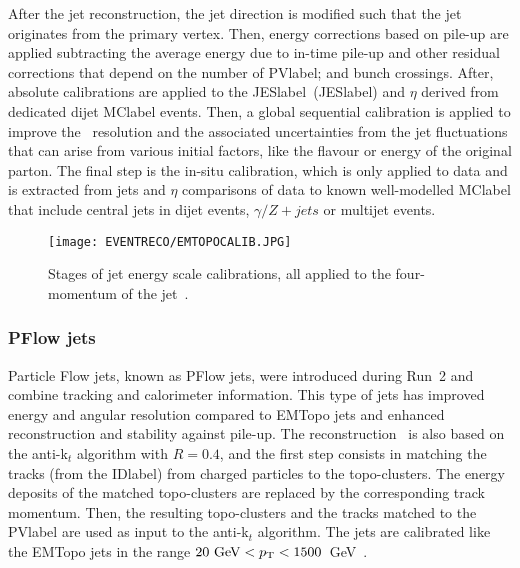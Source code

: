 After the jet reconstruction, the jet direction is modified such that the jet originates from the primary vertex. Then, energy corrections based on pile-up are applied subtracting the average energy due to in-time pile-up and other residual corrections that depend on the number of \acrshort{PVlabel}; and bunch crossings. After, absolute calibrations are applied to the \acrlong{JESlabel}~(\acrshort{JESlabel}) and $\eta$ derived from dedicated dijet \acrshort{MClabel} events. Then, a global sequential calibration is applied to improve the \pT\ resolution and the associated uncertainties from the jet fluctuations that can arise from various initial factors, like the flavour or energy of the original parton. The final step is the in-situ calibration, which is only applied to data and is extracted from jets \pT and $\eta$ comparisons of data to known well-modelled \acrshort{MClabel} that include central jets in dijet events, $\gamma/Z+jets$ or multijet events. 

\clearpage
\begin{figure}[htbp]
    \RawFloats
    \begin{center}
    \texttt{[image: EVENTRECO/EMTOPOCALIB.JPG]}
    \caption{
        Stages of jet energy scale calibrations, all applied to the four-momentum of the jet~\cite{2007.02645}. 
    }
    \label{figEVNTRECO:EMTOPO}
    \end{center}
\end{figure}
\subsubsection{PFlow jets}

Particle Flow jets, known as PFlow jets, were introduced during Run~2 and combine tracking and calorimeter information. This type of jets has improved energy and angular resolution compared to EMTopo jets and enhanced reconstruction and stability against pile-up. The reconstruction~\cite{pflow} is also based on the anti-k$_t$ algorithm with $R=0.4$, and the first step consists in matching the tracks (from the \acrshort{IDlabel}) from charged particles to the topo-clusters. The energy deposits of the matched topo-clusters are replaced by the corresponding track momentum. Then, the resulting topo-clusters and the tracks matched to the \acrshort{PVlabel} are used as input to the anti-k$_t$ algorithm. The jets are calibrated like the EMTopo jets in the range $20\text{ GeV}<p_{\text{T}}<1500$~GeV~\cite{ATLAS_Collaboration2020-ip}. 

